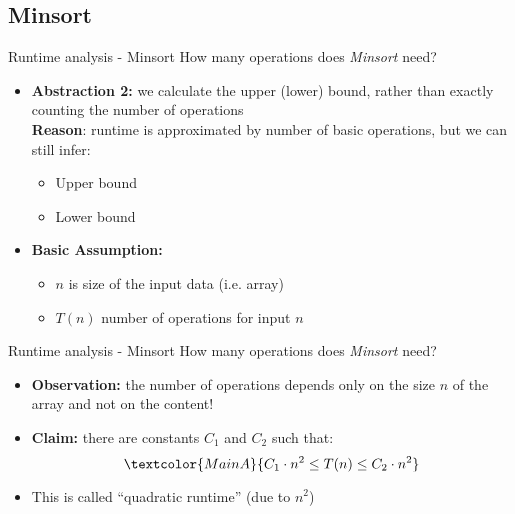 
\subsection{Minsort}


\begin{frame}{Runtime analysis - Minsort}
  How many operations does \textit{Minsort} need?
  \begin{itemize}
    \item<1- |handout:1>
      \textbf{Abstraction 2:} we calculate the upper (lower) bound,
      rather than exactly counting the number of operations\\[0.5em]
      \textbf{Reason}: runtime is approximated by number of basic operations,
      but we can still infer:
      \begin{itemize}
        \item {\color{MainBLight}Upper bound}
        \item {\color{MainBLight}Lower bound}
      \end{itemize}
      \vspace{1em}
    \item<2- |handout:1>
      \textbf{Basic Assumption:}
      \begin{itemize}
        \item
          {\color{MainA}$n$} is size of the input data (i.e. array)
        \item
          {\color{MainA}$T(n)$} number of operations for input
          {\color{MainA}$n$}
      \end{itemize}
  \end{itemize}
\end{frame}


\begin{frame}{Runtime analysis - Minsort}
  How many operations does \textit{Minsort} need?
  \begin{itemize}
    \item<1- |handout:1>
      \textbf{Observation:}
      the number of operations depends only on the size
      {\color{MainA}$n$} of the array and not on the content!
    \item<2- |handout:1>
      \textbf{Claim:} there are constants {\color{MainA}$C_1$}
      and {\color{MainA}$C_2$} such that:
      \begin{displaymath}
        \textcolor{MainA}{C_1 \cdot n^2 \leq T(n) \leq C_2 \cdot n^2}
      \end{displaymath}%
    \item<3- |handout:1>
      This is called \enquote{quadratic runtime} (due to {\color{MainA}$n^2$})
  \end{itemize}
\end{frame}

